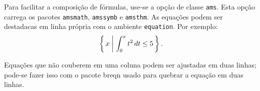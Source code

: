 \documentclass
  [ams,pdfout]%
	{aesbr}
\begin{document}
Para facilitar a composição de fórmulas, use-se a opção de classe \verb|ams|. Esta opção carrega os pacotes \verb|amsmath|, \verb|amssymb| e \verb|amsthm|. As equações podem ser destadacas em linha própria com o ambiente \verb|equation|. Por exemplo:
\begin{equation}
\label{eq:1}
  \left\{\,
    x\biggm|\int_{0}^x t^{2}\,dt\leq5
  \,\right\}.
\end{equation}

Equações que não couberem em uma coluna podem ser ajustadas em duas linhas; pode-se fazer isso com o pacote \textsf{breqn} usado para quebrar a equação em duas linhas.

%
%
%
\end{document}
